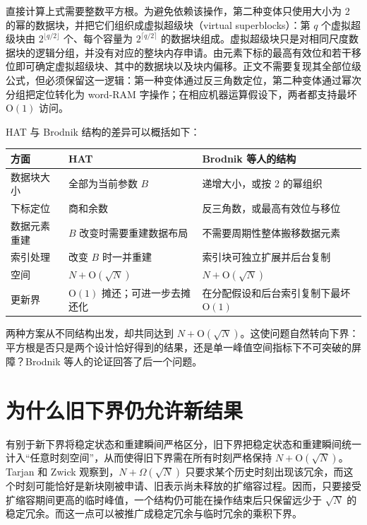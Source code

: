 \documentclass[UTF8,11pt,a4paper]{ctexart}
\begin{document}
直接计算上式需要整数平方根。为避免依赖该操作，第二种变体只使用大小为 2 的幂的数据块，并把它们组织成虚拟超级块（virtual superblocks）：第 $q$ 个虚拟超级块由 $2^{\lfloor q/2\rfloor}$ 个、每个容量为 $2^{\lceil q/2\rceil}$ 的数据块组成。虚拟超级块只是对相同尺度数据块的逻辑分组，并没有对应的整块内存申请。由元素下标的最高有效位和若干移位即可确定虚拟超级块、其中的数据块以及块内偏移。正文不需要复现其全部位级公式，但必须保留这一逻辑：第一种变体通过反三角数定位，第二种变体通过幂次分组把定位转化为 word-RAM 字操作；在相应机器运算假设下，两者都支持最坏 $\mathrm{O}(1)$ 访问。\par

HAT 与 Brodnik 结构的差异可以概括如下：\par

\begin{center}
\small
\begin{tabularx}{\textwidth}{@{}>{\raggedright\arraybackslash}X>{\raggedright\arraybackslash}X>{\raggedright\arraybackslash}X@{}}
\toprule
\textbf{方面} & \textbf{HAT} & \textbf{Brodnik 等人的结构} \\
\midrule
数据块大小 & 全部为当前参数 $B$ & 递增大小，或按 2 的幂组织 \\
下标定位 & 商和余数 & 反三角数，或最高有效位与移位 \\
数据元素重建 & $B$ 改变时需要重建数据布局 & 不需要周期性整体搬移数据元素 \\
索引处理 & 改变 $B$ 时一并重建 & 索引块可独立扩展并后台复制 \\
空间 & $N+\mathrm{O}(\sqrt{N})$ & $N+\mathrm{O}(\sqrt{N})$ \\
更新界 & $\mathrm{O}(1)$ 摊还；可进一步去摊还化 & 在分配假设和后台索引复制下最坏 $\mathrm{O}(1)$ \\
\bottomrule
\end{tabularx}
\end{center}

两种方案从不同结构出发，却共同达到 $N+\mathrm{O}(\sqrt{N})$。这使问题自然转向下界：平方根是否只是两个设计恰好得到的结果，还是单一峰值空间指标下不可突破的屏障？Brodnik 等人的论证回答了后一个问题。\par

\section{为什么旧下界仍允许新结果}

有别于新下界将稳定状态和重建瞬间严格区分，旧下界把稳定状态和重建瞬间统一计入“任意时刻空间”，从而使得旧下界需在所有时刻严格保持 $N+\mathrm{O}(\sqrt{N})$。Tarjan 和 Zwick 观察到，$N+\Omega(\sqrt{N})$ 只要求某个历史时刻出现该冗余，而这个时刻可能恰好是新块刚被申请、旧表示尚未释放的扩缩容过程。因而，只要接受扩缩容期间更高的临时峰值，一个结构仍可能在操作结束后只保留远少于 $\sqrt{N}$ 的稳定冗余。而这一点可以被推广成稳定冗余与临时冗余的乘积下界。\par
\end{document}
